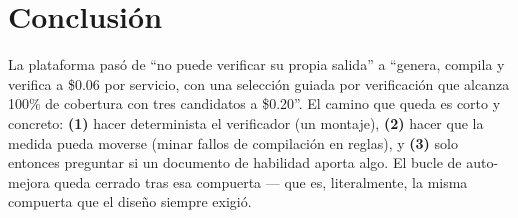 \documentclass[11pt,a4paper]{article}
\begin{document}
\section{Conclusión}

La plataforma pasó de ``no puede verificar su propia salida'' a ``genera, compila y
verifica a \$0.06 por servicio, con una selección guiada por verificación que alcanza
100\% de cobertura con tres candidatos a \$0.20''. El camino que queda es corto y
concreto: \textbf{(1)} hacer determinista el verificador (un montaje), \textbf{(2)}
hacer que la medida pueda moverse (minar fallos de compilación en reglas), y
\textbf{(3)} solo entonces preguntar si un documento de habilidad aporta algo. El
bucle de auto-mejora queda cerrado tras esa compuerta --- que es, literalmente, la
misma compuerta que el diseño siempre exigió.
\end{document}
